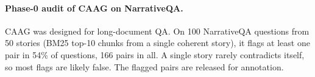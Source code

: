 \paragraph{Phase-0 audit of CAAG on NarrativeQA.}
CAAG was designed for long-document QA. On 100 NarrativeQA \citep{kocisky2018narrativeqa} questions from 50 stories
(BM25 top-10 chunks from a single coherent story), it flags at least one pair in 54\% of questions, 166 pairs in all.
A single story rarely contradicts itself, so most flags are likely false. The flagged pairs are released for annotation.
